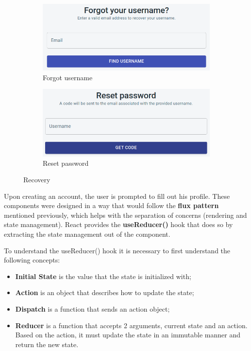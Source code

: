 \begin{figure}[H]
    \centering
    \begin{subfigure}[b]{0.49\textwidth}
        \centering
        \includegraphics[width=0.8\linewidth]{Chapters/img/frontend/forgotUsername.png}
        \caption{Forgot username}
        \label{fig:forgotUsername}
     \end{subfigure}
     \hfill
     \begin{subfigure}[b]{0.49\textwidth}
        \centering
        \includegraphics[width=0.8\linewidth]{Chapters/img/frontend/resetPassword.png}
        \caption{Reset password}
        \label{fig:resetPassword}
     \end{subfigure}
     \caption{Recovery}
\end{figure}

Upon creating an account, the user is prompted to fill out his profile. These components were designed in a way that would follow the \textbf{flux pattern} mentioned previously, which helps with the separation of concerns (rendering and state management). React provides the \textbf{useReducer()} hook that does so by extracting the state management out of the component. 

To understand the useReducer() hook it is necessary to first understand the following concepts:

\begin{itemize}
    \item \textbf{Initial State} is the value that the state is initialized with;
    \item \textbf{Action} is an object that describes how to update the state;
    \item \textbf{Dispatch} is a function that sends an action object;
    \item \textbf{Reducer} is a function that accepts 2 arguments, current state and an action. Based on the action, it must update the state in an immutable manner and return the new state.
\end{itemize}


